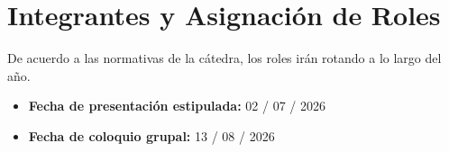 \chapter{Integrantes y Asignación de Roles}
De acuerdo a las normativas de la cátedra, los roles irán rotando a lo largo del año.
\begin{table}[H]
    \centering
    \caption{Tabla de asignación de roles del grupo para el TP4.}
    \label{tab.roles:tp4}
\end{table}

\begin{itemize}
    \item \textbf{Fecha de presentación estipulada:} 02 / 07 / 2026
    \item \textbf{Fecha de coloquio grupal:} 13 / 08 / 2026
\end{itemize}
